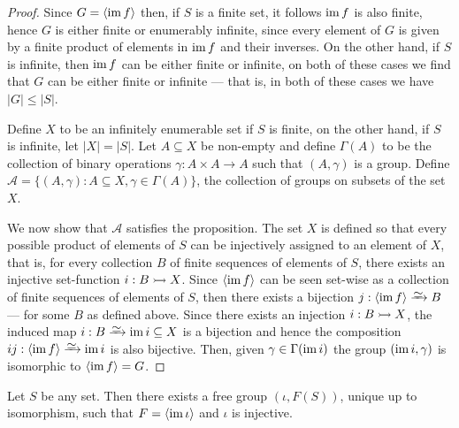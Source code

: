 \begin{proof} Since \(G = \left\langle \operatorname{im} f \right\rangle\) then, if \(S\) is a
finite set, it follows \(\operatorname{im} f\) is also finite, hence \(G\) is either finite or
enumerably infinite, since every element of \(G\) is given by a finite product
of elements in \(\operatorname{im} f\) and their inverses. On the other hand, if \(S\) is
infinite, then \(\operatorname{im} f\) can be either finite or infinite, on both of these
cases we find that \(G\) can be either finite or infinite --- that is, in both
of these cases we have \(|G| \leq |S|\).

Define \(X\) to be an infinitely enumerable set if \(S\) is finite, on the other
hand, if \(S\) is infinite, let \(|X| = |S|\). Let \(A \subseteq X\) be
non-empty and define \(\Gamma(A)\) to be the collection of binary operations
\(\gamma: A \times A \to A\) such that \((A, \gamma)\) is a group. Define
\(\mathcal{A} = \{(A, \gamma) \colon A \subseteq X, \gamma \in \Gamma(A)\}\), the
collection of groups on subsets of the set \(X\).

We now show that \(\mathcal{A}\) satisfies the proposition. The set \(X\) is
defined so that every possible product of elements of \(S\) can be injectively
assigned to an element of \(X\), that is, for every collection \(B\) of finite
sequences of elements of \(S\), there exists an injective set-function \(i: B
\rightarrowtail X\). Since \(\left\langle \operatorname{im} f \right\rangle\) can be seen set-wise as a
collection of finite sequences of elements of \(S\), then there exists a
bijection \(j: \left\langle \im f \right\rangle \isoto B\) --- for some \(B\) as
defined above. Since there exists an injection \(i: B \rightarrowtail X\), the induced map
\(i: B \isoto \im i \subseteq X\) is a bijection and hence the composition \(ij:
\left\langle \im f \right\rangle \isoto \im i\) is also bijective. Then, given
\(\gamma \in \Gamma(\operatorname{im} i)\) the group \((\operatorname{im} i, \gamma)\) is isomorphic to
\(\left\langle \operatorname{im} f \right\rangle = G\).
\end{proof}

\begin{proposition}
\label{prop:universal-free-group}
Let \(S\) be any set. Then there exists a free group \((\iota, F(S))\), unique
up to isomorphism, such that \(F = \left\langle \operatorname{im} \iota \right\rangle\) and
\(\iota\) is injective.
\end{proposition}

